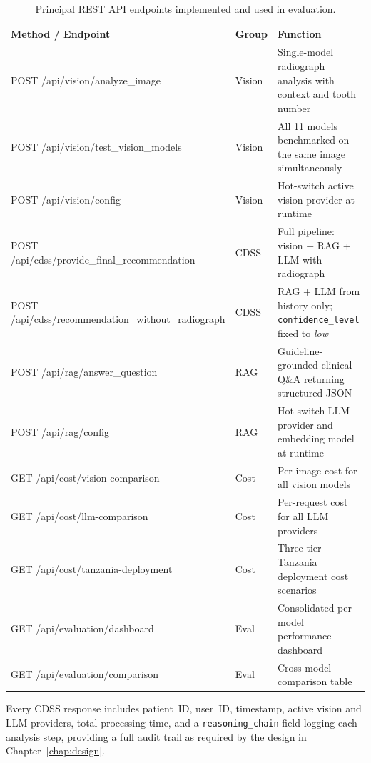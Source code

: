 \documentclass[12pt,a4paper]{report}
\begin{document}
	\begin{table}[H]
		\centering
		\caption{Principal REST API endpoints implemented and used in evaluation.}
		\label{tab:endpoints}
		\small
		\renewcommand{\arraystretch}{1.2}
		\begin{tabularx}{\textwidth}{@{}l l X@{}}
			\toprule
			\textbf{Method / Endpoint} & \textbf{Group} & \textbf{Function} \\
			\midrule
			POST /api/vision/analyze\_image                    & Vision & Single-model radiograph analysis with context and tooth number \\
			POST /api/vision/test\_vision\_models              & Vision & All 11 models benchmarked on the same image simultaneously \\
			POST /api/vision/config                            & Vision & Hot-switch active vision provider at runtime \\
			POST /api/cdss/provide\_final\_recommendation      & CDSS   & Full pipeline: vision + RAG + LLM with radiograph \\
			POST /api/cdss/recommendation\_without\_radiograph & CDSS   & RAG + LLM from history only; \texttt{confidence\_level} fixed to \textit{low} \\
			POST /api/rag/answer\_question                     & RAG    & Guideline-grounded clinical Q\&A returning structured JSON \\
			POST /api/rag/config                               & RAG    & Hot-switch LLM provider and embedding model at runtime \\
			GET  /api/cost/vision-comparison                   & Cost   & Per-image cost for all vision models \\
			GET  /api/cost/llm-comparison                      & Cost   & Per-request cost for all LLM providers \\
			GET  /api/cost/tanzania-deployment                 & Cost   & Three-tier Tanzania deployment cost scenarios \\
			GET  /api/evaluation/dashboard                     & Eval   & Consolidated per-model performance dashboard \\
			GET  /api/evaluation/comparison                    & Eval   & Cross-model comparison table \\
			\bottomrule
		\end{tabularx}
	\end{table}
	
	Every CDSS response includes patient~ID, user~ID, timestamp, active
	vision and LLM providers, total processing time, and a
	\texttt{reasoning\_chain} field logging each analysis step, providing a
	full audit trail as required by the design in Chapter~\ref{chap:design}.
	
\end{document}
